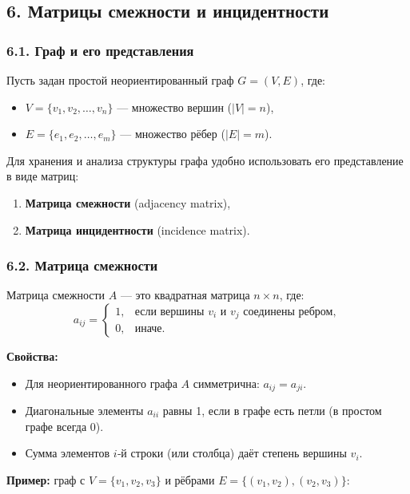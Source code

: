 \subsection{6. Матрицы смежности и инцидентности}

\subsubsection{6.1. Граф и его представления}

Пусть задан простой неориентированный граф $G = (V, E)$, где:
\begin{itemize}[leftmargin=*]
  \item $V = \{v_1, v_2, \dots, v_n\}$ — множество вершин ($|V| = n$),
  \item $E = \{e_1, e_2, \dots, e_m\}$ — множество рёбер ($|E| = m$).
\end{itemize}

Для хранения и анализа структуры графа удобно использовать его представление в виде матриц:
\begin{enumerate}[label=\arabic*)]
  \item \textbf{Матрица смежности} (adjacency matrix),
  \item \textbf{Матрица инцидентности} (incidence matrix).
\end{enumerate}

\subsubsection{6.2. Матрица смежности}

Матрица смежности $A$ — это квадратная матрица $n \times n$, где:
\[
  a_{ij} = \begin{cases}
    1, & \text{если вершины } v_i \text{ и } v_j \text{ соединены ребром}, \\
    0, & \text{иначе}.
  \end{cases}
\]

\textbf{Свойства:}
\begin{itemize}[leftmargin=*]
  \item Для неориентированного графа $A$ симметрична: $a_{ij} = a_{ji}$.
  \item Диагональные элементы $a_{ii}$ равны 1, если в графе есть петли (в простом графе всегда 0).
  \item Сумма элементов $i$‑й строки (или столбца) даёт степень вершины $v_i$.
\end{itemize}

\textbf{Пример:} граф с $V = \{v_1, v_2, v_3\}$ и рёбрами $E = \{(v_1,v_2), (v_2,v_3)\}$:

